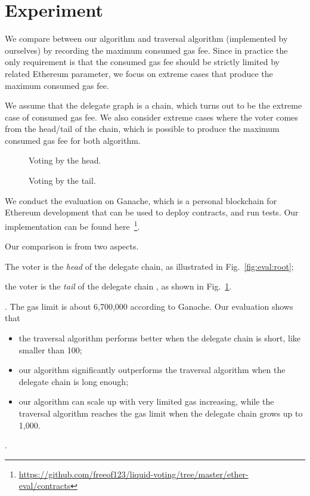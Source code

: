 \section{Experiment}
We compare between our algorithm and traversal algorithm (implemented by ourselves) by
recording the maximum consumed gas fee. Since in practice the only requirement is that the  consumed gas fee should be strictly limited by related Ethereum parameter, we focus on extreme cases that produce the maximum consumed gas fee. 

We assume that the delegate graph is a chain, which turns out to be the extreme case of consumed gas fee. We also consider extreme cases where the voter comes from the head/tail of the chain, which is possible to produce the maximum consumed gas fee for both algorithm.

\begin{figure}[h]
\begin{minipage}[t]{0.5\textwidth}
 
  \caption{Voting by the head.}
  \label{fig:eval:root}
\end{minipage}
\begin{minipage}[t]{0.5\textwidth}
 
  \caption{Voting by the tail.}
  \label{fig:eval:tail}
\end{minipage}
\end{figure}

We conduct the evaluation on Ganache, which is a
personal blockchain for Ethereum development that can be used to deploy contracts, and run tests.
Our implementation can be found here~\footnote{\url{https://github.com/freeof123/liquid-voting/tree/master/ether-eval/contracts}}.

Our comparison is from two aspects. \begin{enumerate*}[1) ]%
  \item The voter is the \emph{head} of the delegate chain, as illustrated in
  Fig.~\ref{fig:eval:root}; \item the voter is the \emph{tail} of the delegate chain
, as shown in Fig.~\ref{fig:eval:tail}. \end{enumerate*}.
The gas limit is about 6,700,000 according to Ganache. Our
evaluation shows that \begin{itemize}
    \item the traversal algorithm performs better when the delegate chain
      is short, like smaller than 100;
    \item our algorithm significantly outperforms the traversal algorithm when
      the delegate chain is long enough;
    \item our algorithm can scale up with very limited gas increasing, while
      the traversal algorithm reaches the gas limit when the delegate chain
      grows up to 1,000.
\end{itemize}.



